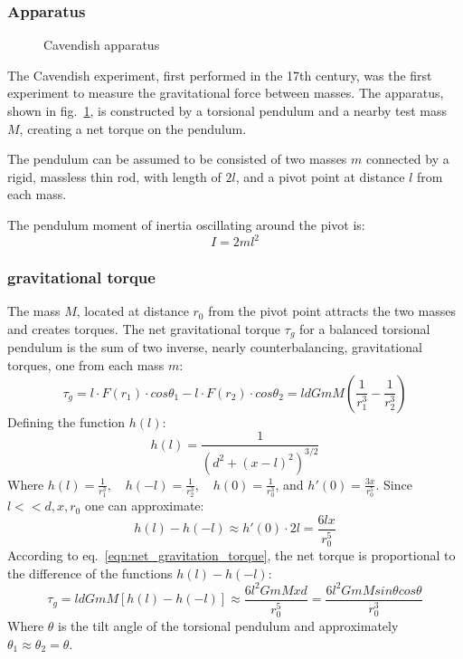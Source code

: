 \documentclass[\main/master.tex]{subfiles}
\begin{document}
\subsubsection{Apparatus}
\begin{figure}[htbp]
	\centering
	\caption[Cavendish apparatus]{Cavendish apparatus \cite{howell2019}}
	\label{fig:Cavendish apparatus}
\end{figure}
\par\noindent
The Cavendish experiment, first performed in the 17th century, was the first experiment to measure the gravitational force between masses. The apparatus, shown in fig.~\ref{fig:Cavendish apparatus}, is constructed by a torsional pendulum and a nearby test mass $M$, creating a net torque on the pendulum. 
\par\noindent
The pendulum can be assumed to be consisted of two masses $m$ connected by a rigid, massless thin rod, with length of $2l$, and a pivot point at distance $l$ from each mass.
\par\noindent
The pendulum moment of inertia oscillating around the pivot is:
\begin{equation}
I = 2ml^2     \label{eqn:moment_inertia}
\end{equation} 
\subsubsection{gravitational torque}
The mass $M$, located at distance $r_0$ from the pivot point attracts the two masses and creates torques. The net gravitational torque $\tau_g$ for a balanced torsional pendulum is the sum of two inverse, nearly counterbalancing, gravitational torques, one from each mass $m$:
\begin{equation}
\tau_g = l \cdot F(r_1) \cdot cos\theta_1 - l \cdot F(r_2) \cdot cos\theta_2 = l d GmM(\frac{1}{r_1^3} - \frac{1}{r_2^3})     \label{eqn:net_gravitation_torque}
\end{equation}
Defining the function $h(l)$:
\begin{equation}
h(l) = \frac{1}{(d^2 +(x-l)^2)^{3/2}} \label{eqn:gravitation torque func}
\end{equation}
Where $h(l) = \frac{1}{r_1^3},\quad	h(-l) = \frac{1}{r_2^3},\quad	h(0) = \frac{1}{r_0^3}$, and $h'(0) = \frac{3x}{r_0^5}$. Since $l<<d,x,r_0$ one can approximate:
\begin{equation}
h(l)-h(-l)\approx h'(0)\cdot 2l = \frac{6lx}{r_0^5}\label{eqn:approximation}
\end{equation}
According to eq.~\ref{eqn:net_gravitation_torque}, the net torque is proportional to the difference of the functions $h(l)-h(-l)$:
\begin{equation}
\tau_g = l d GmM[h(l)-h(-l)]\approx \frac{6l^2GmMxd} {r_0^5} = \frac{6l^2GmM sin\theta cos\theta}{r_0^3}      
\label{eqn:net_gravitation_torque_approx}
\end{equation}
Where $\theta$ is the tilt angle of the torsional pendulum and approximately $\theta_1 \approx \theta_2 = \theta$.
\end{document}
